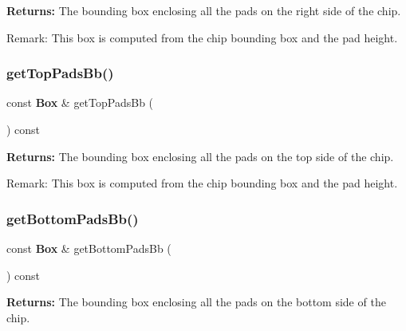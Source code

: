 {\bfseries Returns\+:} The bounding box enclosing all the pads on the right side of the chip.

\begin{DoxyParagraph}{Remark\+:}
This box is computed from the chip bounding box and the pad height. 
\end{DoxyParagraph}
\mbox{\label{classKatabatic_1_1ChipTools_ad31ff1dbfdf55216d684b4032a73db6b}} 
\subsubsection{\texorpdfstring{get\+Top\+Pads\+Bb()}{getTopPadsBb()}}
{\footnotesize\ttfamily const \textbf{ Box} \& get\+Top\+Pads\+Bb (\begin{DoxyParamCaption}{ }\end{DoxyParamCaption}) const\hspace{0.3cm}{\ttfamily [inline]}}

{\bfseries Returns\+:} The bounding box enclosing all the pads on the top side of the chip.

\begin{DoxyParagraph}{Remark\+:}
This box is computed from the chip bounding box and the pad height. 
\end{DoxyParagraph}
\mbox{\label{classKatabatic_1_1ChipTools_aad46c56aeb14b07fcdfe93b51c554828}} 
\subsubsection{\texorpdfstring{get\+Bottom\+Pads\+Bb()}{getBottomPadsBb()}}
{\footnotesize\ttfamily const \textbf{ Box} \& get\+Bottom\+Pads\+Bb (\begin{DoxyParamCaption}{ }\end{DoxyParamCaption}) const\hspace{0.3cm}{\ttfamily [inline]}}

{\bfseries Returns\+:} The bounding box enclosing all the pads on the bottom side of the chip.

